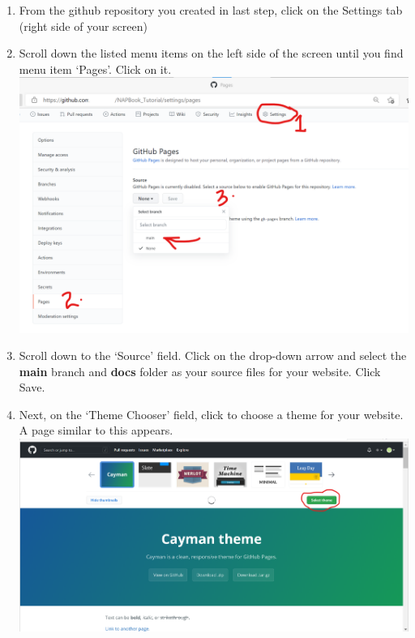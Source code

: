 \documentclass[
]{book}
\providecommand{\tightlist}{%
  \setlength{\itemsep}{0pt}\setlength{\parskip}{0pt}}
\begin{document}
\begin{enumerate}
\def\labelenumi{\arabic{enumi}.}
\tightlist
\item
  From the github repository you created in last step, click on the Settings tab (right side of your screen)\\
\item
  Scroll down the listed menu items on the left side of the screen until you find menu item `Pages'. Click on it.\\
  \includegraphics{tutorial_screenshots/gh_pages_setup.png}
\item
  Scroll down to the `Source' field. Click on the drop-down arrow and select the \textbf{main} branch and \textbf{docs} folder as your source files for your website. Click Save.\\
\item
  Next, on the `Theme Chooser' field, click to choose a theme for your website.\\
  A page similar to this appears. \includegraphics{tutorial_screenshots/gh_pages_theme.png}
\end{enumerate}
\end{document}
